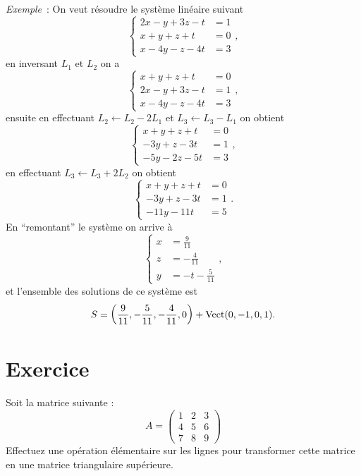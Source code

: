   \emph{Exemple}~: On veut résoudre le système linéaire suivant
  \begin{equation}
    \begin{cases}
      2x-y+3z-t& = 1\\
      x+y+z+t& = 0\\
      x-4y-z-4t& = 3
    \end{cases},
  \end{equation}
  en inversant \(L_1\) et \(L_2\) on a
  \begin{equation}
    \begin{cases} x+y+z+t& = 0\\
      2x-y+3z-t& = 1\\
      x-4y-z-4t& = 3
    \end{cases},
    \end{equation}
    ensuite en effectuant \(L_2 \leftarrow L_2-2L_1\) et \(L_3 \leftarrow 
    L_3-L_1\) on obtient
    \begin{equation}
      \begin{cases} x+y+z+t& = 0\\
        -3y+z-3t& = 1\\
        -5y-2z-5t& = 3
      \end{cases},
      \end{equation}
      en effectuant \(L_3 \leftarrow L_3+2L_2\) on obtient
      \begin{equation}
        \begin{cases} x+y+z+t& = 0\\
          -3y+z-3t& = 1\\
          -11y-11t& = 5
        \end{cases}.
        \end{equation}
        En ``remontant'' le système on arrive à
        \begin{equation}
          \begin{cases}
            x &= \frac{9}{11} \\
            z &= -\frac{4}{11}\\
            y &= -t -\frac{5}{11}
          \end{cases},
        \end{equation}
        et l'ensemble des solutions de ce système est
        \begin{equation}
          S = \left(\frac{9}{11}, -\frac{5}{11}, -\frac{4}{11}, 0\right) + 
          \operatorname{Vect}(0,-1,0,1).
        \end{equation}
\section{Exercice}
\begin{exercice}
Soit la matrice suivante :
\[
A = \begin{pmatrix}
1 & 2 & 3 \\
4 & 5 & 6 \\
7 & 8 & 9
\end{pmatrix}
\]
Effectuez une opération élémentaire sur les lignes pour transformer cette matrice en une matrice triangulaire supérieure.
\end{exercice}

